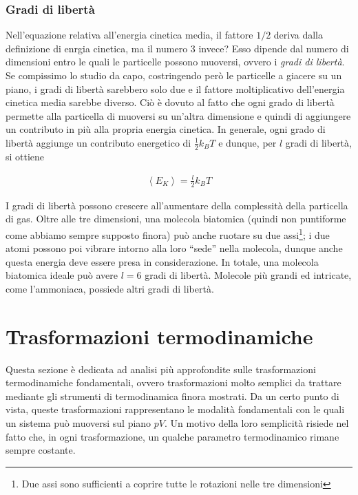 \subsubsection*{Gradi di libertà}
Nell'equazione relativa all'energia cinetica media,
il fattore $1/2$ deriva dalla definizione di enrgia cinetica, ma
il numero $3$ invece? Esso dipende dal numero di dimensioni entro
le quali le particelle possono muoversi, ovvero i \textit{gradi di
libertà}. Se compissimo lo studio da capo, costringendo però le particelle
a giacere su un piano, i gradi di libertà sarebbero solo due e il fattore
moltiplicativo
dell'energia cinetica media sarebbe diverso. Ciò è dovuto al fatto
che ogni grado di libertà permette alla particella di muoversi su
un'altra dimensione e quindi di aggiungere un contributo in più alla
propria energia cinetica. In generale, ogni grado di
libertà aggiunge un contributo energetico di $\frac12k_BT$ e
dunque, per $l$ gradi di libertà, si ottiene

\begin{align}
    \left\langle E_K \right\rangle = \frac{l}{2}k_BT
\end{align}

I gradi di libertà possono crescere all'aumentare della complessità
della particella di gas. Oltre alle tre dimensioni, una molecola
biatomica (quindi non puntiforme come abbiamo sempre supposto finora)
può anche ruotare su due assi\footnote{Due assi sono sufficienti a
coprire tutte le rotazioni nelle tre dimensioni}; i due atomi possono
poi vibrare intorno alla loro ``sede'' nella molecola, dunque anche
questa energia deve essere presa in considerazione. In totale, una
molecola biatomica ideale può avere $l = 6$ gradi di libertà. Molecole
più grandi ed intricate, come l'ammoniaca, possiede altri gradi di libertà.





\section{Trasformazioni termodinamiche}
Questa sezione è dedicata ad analisi più approfondite sulle trasformazioni
termodinamiche fondamentali, ovvero trasformazioni molto semplici da
trattare mediante gli strumenti di termodinamica finora mostrati. Da
un certo punto di vista, queste trasformazioni rappresentano le modalità
fondamentali con le quali un sistema può muoversi sul piano $pV$. Un
motivo della loro semplicità risiede nel fatto che, in ogni trasformazione,
un qualche parametro termodinamico rimane sempre costante.

